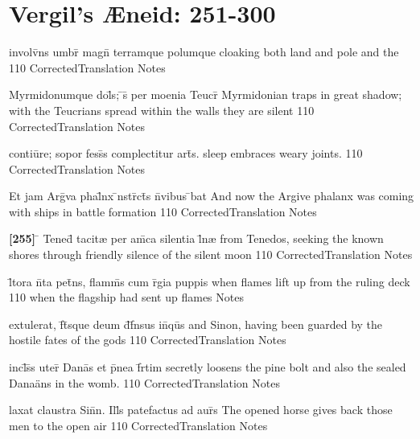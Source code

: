 \section{Vergil's {\AE}neid: 251-300} %

\latline
  {involv\={}ns umbr\={} magn\={} terramque polumque}
  { cloaking both land and pole and the }
  {110}
  { CorrectedTranslation }
  { Notes }


\latline
  {Myrmidonumque dol\={}s; \={}s\={\macron {\i}} per moenia Teucr\={\macron {\i}}}
  { Myrmidonian traps in great shadow; with the Teucrians spread within the walls they are silent }
  {110}
  { CorrectedTranslation }
  { Notes }


\latline
  {contiu\={}re; sopor fess\={}s complectitur art\={}s.}
  { sleep embraces weary joints. }
  {110}
  { CorrectedTranslation }
  { Notes }


\latline
  {Et jam Arg\={\macron {\i}}va phal\={}nx \={\macron {\i}}nstr\={}ct\={\macron {\i}}s n\={}vibus \={\macron {\i}}bat}
  { And now the Argive phalanx was coming with ships in battle formation }
  {110}
  { CorrectedTranslation }
  { Notes }


\latline
  {\textbf{[255]} \={} Tened\={} tacit{\ae} per am\={\macron {\i}}ca silentia l\={}n{\ae}}
  { from Tenedos, seeking the known shores through friendly silence of the silent moon }
  {110}
  { CorrectedTranslation }
  { Notes }


\latline
  {l\={\macron {\i}}tora n\={}ta pet\={}ns, flamm\={}s cum r\={}gia puppis}
  { when flames lift up from the ruling deck }
  {110}
  { when the flagship had sent up flames }
  { Notes }


\latline
  {extulerat, f\={}t\={\macron {\i}}sque deum d\={}f\={}nsus in\={\macron {\i}}qu\={\macron {\i}}s}
  { and Sinon, having been guarded by the hostile fates of the gods }
  {110}
  { CorrectedTranslation }
  { Notes }


\latline
  {incl\={}s\={}s uter\={} Dana\={}s et p\={\macron {\i}}nea f\={}rtim}
  { secretly loosens the pine bolt and also the sealed Dana\"ans in the womb.  }
  {110}
  { CorrectedTranslation }
  { Notes }


\latline
  {laxat claustra Sin\={}n.  Ill\={}s patefactus ad aur\={}s}
  { The opened horse gives back those men to the open air }
  {110}
  { CorrectedTranslation }
  { Notes }


